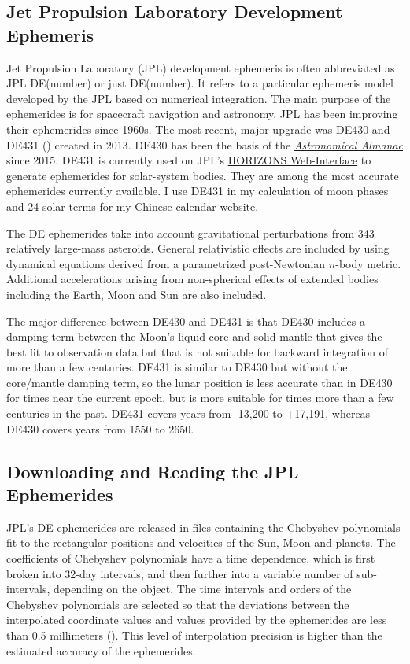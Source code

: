 \documentclass[12pt]{article}
\begin{document}
\begin{CJK}{UTF8}{bkai}
\section{Jet Propulsion Laboratory Development Ephemeris}
\label{sec:jpleph}

Jet Propulsion Laboratory (JPL) development ephemeris is often 
abbreviated as JPL DE(number) or just DE(number). It refers to a particular 
ephemeris model developed by the JPL based on numerical integration. 
The main purpose of the ephemerides is for spacecraft navigation and astronomy. 
JPL has been improving their ephemerides since 1960s. The most recent, major 
upgrade was DE430 and DE431 (\cite{folkner14})
created in 2013. DE430 has been the basis of the 
\href{https://en.wikipedia.org/wiki/Astronomical_Almanac}{\it Astronomical Almanac} 
since 2015. DE431 is currently used on JPL's \href{https://ssd.jpl.nasa.gov/horizons.cgi}
{HORIZONS Web-Interface} to generate ephemerides for solar-system bodies. 
They are among the most accurate ephemerides currently available. 
I use DE431 in my calculation of moon phases and 24 solar terms for my 
\href{../index.html}{Chinese calendar website}. 

The DE ephemerides take into account gravitational perturbations from 
343 relatively large-mass asteroids. General relativistic effects are 
included by using dynamical equations derived from a parametrized 
post-Newtonian $n$-body metric. Additional accelerations arising 
from non-spherical effects of extended bodies including the Earth, 
Moon and Sun are also included. 

The major difference between DE430 and DE431 is that DE430 includes 
a damping term between the Moon's liquid core and solid mantle that 
gives the best fit to observation data but that is not 
suitable for backward integration of more than a few centuries. 
DE431 is similar to DE430 but without the 
core/mantle damping term, so the lunar position is less accurate than 
in DE430 for times near the current epoch, but is more suitable 
for times more than a few centuries in the past. DE431 covers 
years from -13,200 to +17,191, whereas DE430 covers years from 
1550 to 2650.

\subsection{Downloading and Reading the JPL Ephemerides}

JPL's DE ephemerides are released in files containing the 
Chebyshev polynomials fit to the rectangular positions and velocities of the 
Sun, Moon and planets. 
The coefficients of Chebyshev polynomials have a time dependence, which is first broken into
32-day intervals, and then further into a variable number of
sub-intervals, depending on the object.
The time intervals and 
orders of the Chebyshev polynomials are 
selected so that the deviations between the interpolated coordinate values 
and values provided by the ephemerides are less than 0.5 
millimeters (\cite{newhall89}). This level of interpolation 
precision is higher than the estimated accuracy of the ephemerides. 


\end{CJK}
\end{document}
